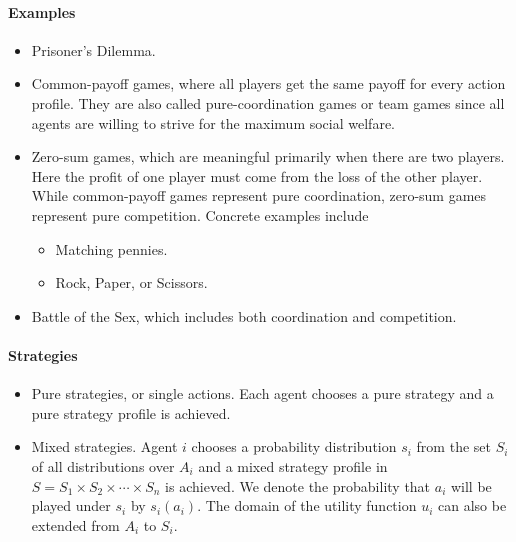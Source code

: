 \documentclass{article}
\begin{document}
\paragraph{Examples}
\begin{itemize}
\item Prisoner's Dilemma.
\item Common-payoff games, where all players get the same payoff for every action profile. They are also called pure-coordination games or team games since all agents are willing to strive for the maximum social welfare. 
\item Zero-sum games, which are meaningful primarily when there are two players. Here the profit of one player must come from the loss of the other player. While common-payoff games represent pure coordination, zero-sum games represent pure competition. Concrete examples include
\begin{itemize}
\item Matching pennies.
\item Rock, Paper, or Scissors.
\end{itemize}
\item Battle of the Sex, which includes both coordination and competition.
\end{itemize}

\paragraph{Strategies}
\begin{itemize}
\item Pure strategies, or single actions. Each agent chooses a pure strategy and a pure strategy profile is achieved.
\item Mixed strategies. Agent $i$ chooses a probability distribution $s_i$ from the set $S_i$ of all distributions over $A_i$ and a mixed strategy profile in $S=S_1\times S_2\times\cdots\times S_n$ is achieved. We denote the probability that $a_i$ will be played under $s_i$ by $s_i(a_i)$. The domain of the utility function $u_i$ can also be extended from $A_i$ to $S_i$.
\end{itemize}
\end{document}
